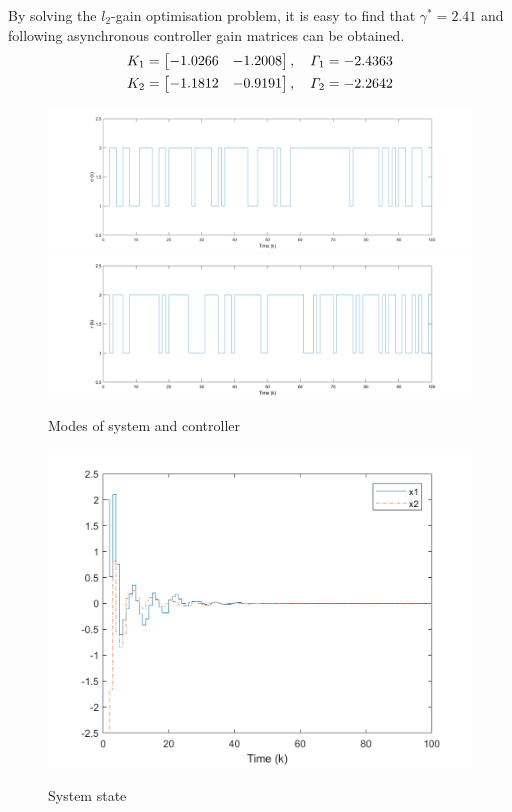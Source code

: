 \documentclass[conference]{IEEEtran}
\begin{document}
By solving the $l_2$-gain optimisation problem, it is easy to find that $\gamma^{*}=2.41$ and following asynchronous controller gain matrices can be obtained.
\begin{equation}\notag
	\begin{aligned}
		K_{1}=\begin{bmatrix}
			-1.0266&-1.2008
		\end{bmatrix},\quad
		\varGamma_{1}=-2.4363 \\
		K_{2}=\begin{bmatrix}
		-1.1812&-0.9191
		\end{bmatrix},\quad
		\varGamma_{2}=-2.2642
	\end{aligned}
\end{equation}

\begin{figure}[!htb]
	\centering\includegraphics[scale=0.15]{./simulink/mode_p.png}\\
	\centering\includegraphics[scale=0.15]{./simulink/mode_k.png}\\
	\caption{Modes of system and controller}
	\label{fig.1}
\end{figure}

\begin{figure}[!htb]
	\centering\includegraphics[scale=0.35]{./simulink/state.png}\\
	\caption{System state}
	\label{fig.2}
\end{figure}
\end{document}
